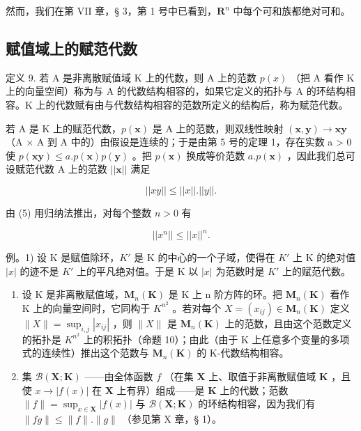 然而，我们在第 VII 章，§ 3，第 1 号中已看到，\(\mathbf{R}^n\) 中每个可和族都绝对可和。

\subsection{赋值域上的赋范代数}

定义 9. 若 A 是非离散赋值域 K 上的代数，则 A 上的范数 \(p(x)\) （把 A 看作 K 上的向量空间）称为与 A 的代数结构相容的，如果它定义的拓扑与 A 的环结构相容。K 上的代数赋有由与代数结构相容的范数所定义的结构后，称为赋范代数。

若 A 是 K 上的赋范代数，\(p(\boldsymbol{x})\) 是 A 上的范数，则双线性映射 \((\boldsymbol{x}, \boldsymbol{y}) \to \boldsymbol{x}\boldsymbol{y}\) （A × A 到 A 中的）由假设是连续的；于是由第 5 号的定理 1，存在实数 a \textgreater{} 0 使 \(p(\boldsymbol{x}\boldsymbol{y}) \leqslant a.p(\boldsymbol{x})p(\boldsymbol{y})\) 。把 \(p(\boldsymbol{x})\) 换成等价范数 \(a.p(\boldsymbol{x})\) ，因此我们总可设赋范代数 A 上的范数 \(||\boldsymbol{x}||\) 满足

\[
\left| \left| x y \right| \right| \leqslant \left| \left| x \right| \right|. \left| \left| y \right| \right|.\tag{5}
\]

由 (5) 用归纳法推出，对每个整数 \(n > 0\) 有

\[
\left| \left| x ^ {n} \right| \right| \leqslant \left| \left| x \right| \right| ^ {n}.\tag{6}
\]

例。1) 设 K 是赋值除环，\(K'\) 是 K 的中心的一个子域，使得在 \(K'\) 上 K 的绝对值 \(|x|\) 的迹不是 \(K'\) 上的平凡绝对值。于是 K 以 \(|x|\) 为范数时是 \(K'\) 上的赋范代数。

\begin{enumerate}
\def\labelenumi{\arabic{enumi})}
\setcounter{enumi}{1}
\item
  设 K 是非离散赋值域，\(\mathbf{M}_{n}(\mathbf{K})\) 是 K 上 n 阶方阵的环。把 \(\mathbf{M}_{n}(\mathbf{K})\) 看作 K 上的向量空间时，它同构于 \(K^{n^{2}}\) 。若对每个 \(X = (x_{ij}) \in \mathbf{M}_{n}(\mathbf{K})\) 定义 \(\|X\| = \sup_{i,j} |x_{ij}|\) ，则 \(\|X\|\) 是 \(\mathbf{M}_{n}(\mathbf{K})\) 上的范数，且由这个范数定义的拓扑是 \(K^{n^{2}}\) 上的积拓扑（命题 10）；由此（由于 K 上任意多个变量的多项式的连续性）推出这个范数与 \(\mathbf{M}_{n}(\mathbf{K})\) 的 K-代数结构相容。
\item
  集 \(\mathcal{B}(\mathbf{X};\mathbf{K})\) ——由全体函数 \(f\) （在集 \(\mathbf{X}\) 上、取值于非离散赋值域 \(\mathbf{K}\) ，且使 \(x\to |f(x)|\) 在 \(\mathbf{X}\) 上有界）组成——是 \(\mathbf{K}\) 上的代数；范数 \(\| f\| = \sup_{x\in \mathbf{X}}|f(x)|\) 与 \(\mathcal{B}(\mathbf{X};\mathbf{K})\) 的环结构相容，因为我们有 \(\| fg\| \leqslant \| f\| .\| g\|\) （参见第 X 章，§ 1）。
\end{enumerate}

